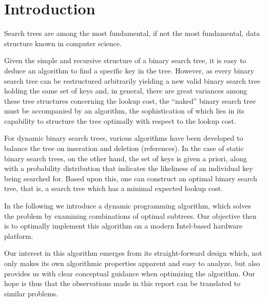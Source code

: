 
\section{Introduction}\label{sec:intro}
Search trees are among the most fundamental, if not the most fundamental, data
structure known in computer science. 

Given the simple and recursive structure of a binary search tree, it is easy to
deduce an algorithm to find a specific key in the tree. However, as every binary
search tree can be restructured arbitrarily yielding a new valid binary search
tree holding the same set of keys and, in general, there are great variances
among these tree structures concerning the lookup cost, the ``naked''
binary search tree must be accompanied by an algorithm, the sophistication of
which lies in its capability to structure the tree optimally with respect to the
lookup cost.

For dynamic binary search trees, various algorithms have been developed to
balance the tree on inseration and deletion (references). In the case of static
binary search trees, on the other hand, the set of keys is given a priori, along
with a probability distribution that indicates the likeliness of an individual
key being searched for. Based upon this, one can construct an optimal binary
search tree, that is, a search tree which has a minimal expected lookup cost.

In the following we introduce a dynamic programming algorithm, which solves the
problem by examining combinations of optimal subtrees. Our objective then is to
optimally implement this algorithm on a modern Intel-based hardware platform.

Our interest in this algorithm emerges from its straight-forward design which,
not only makes its own algorithmic properties apparent and easy to analyze, but
also provides us with clear conceptual guidance when optimizing the algorithm.
Our hope is thus that the observations made in this report can be translated to
similar problems.
